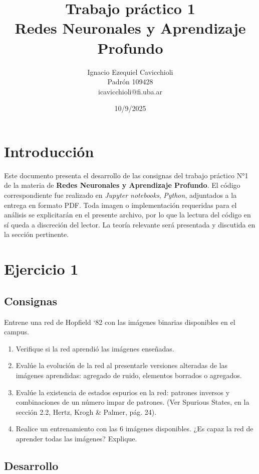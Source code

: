 \documentclass[11pt]{article} %
\title{Trabajo práctico 1\\ Redes Neuronales y Aprendizaje Profundo}
\author{Ignacio Ezequiel Cavicchioli\\Padrón 109428\\icavicchioli@fi.uba.ar}
\date{10/9/2025} %
\begin{document}
\maketitle

\tableofcontents



\section{Introducción}

Este documento presenta el desarrollo de las consignas del trabajo práctico N°1 de la materia de \textbf{Redes Neuronales y Aprendizaje Profundo}.  El código correspondiente fue realizado en  \textit{Jupyter notebooks}, \textit{Python}, adjuntados a la entrega en formato PDF. Toda imagen o implementación requeridas para el análisis se explicitarán en el presente archivo, por lo que la lectura del código en sí queda a discreción del lector. La teoría relevante será presentada y discutida en la sección pertinente.

\newpage

\section{Ejercicio 1}

\subsection{Consignas}
Entrene una red de Hopfield ‘82 con las imágenes binarias disponibles en el campus. 
\begin{enumerate}[label=\alph*]
\item Verifique si la red aprendió las imágenes enseñadas.
\item Evalúe la evolución de la red al presentarle versiones alteradas de las imágenes
aprendidas: agregado de ruido, elementos borrados o agregados.
\item Evalúe la existencia de estados espurios en la red: patrones inversos y
combinaciones de un número impar de patrones. (Ver Spurious States, en la sección
2.2, Hertz, Krogh \& Palmer, pág. 24).
\item Realice un entrenamiento con las 6 imágenes disponibles. ¿Es capaz la red de
aprender todas las imágenes? Explique.
\end{enumerate}

\subsection{Desarrollo}
\end{document}
